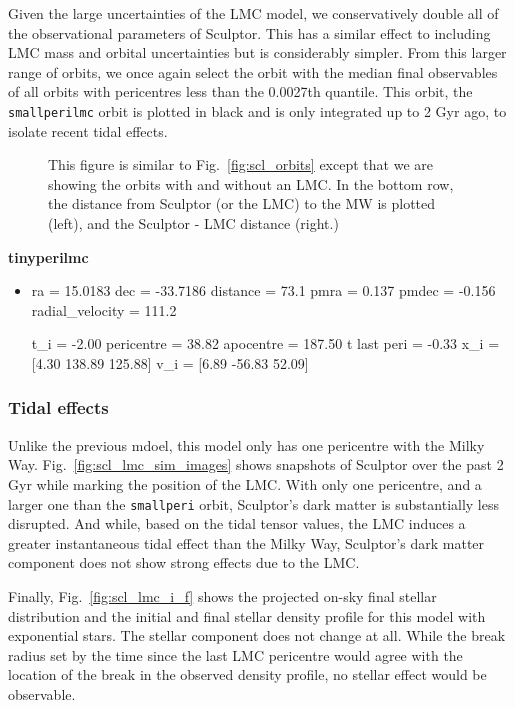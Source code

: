 Given the large uncertainties of the LMC model, we conservatively double
all of the observational parameters of Sculptor. This has a similar
effect to including LMC mass and orbital uncertainties but is
considerably simpler. From this larger range of orbits, we once again
select the orbit with the median final observables of all orbits with
pericentres less than the 0.0027th quantile. This orbit, the
\texttt{smallperilmc} orbit is plotted in black and is only integrated
up to 2 Gyr ago, to isolate recent tidal effects.

\begin{figure}
\centering
{}
\caption[Sculptor Orbits with LMC]{This figure is similar to
Fig.~\ref{fig:scl_orbits} except that we are showing the orbits with and
without an LMC. In the bottom row, the distance from Sculptor (or the
LMC) to the MW is plotted (left), and the Sculptor - LMC distance
(right.)}\label{fig:scl_lmc_orbits_effect}
\end{figure}

\textbf{tinyperilmc}

\begin{itemize}
\item
  ra = 15.0183 dec = -33.7186 distance = 73.1 pmra = 0.137 pmdec =
  -0.156 radial\_velocity = 111.2

  t\_i = -2.00 pericentre = 38.82 apocentre = 187.50 t last peri = -0.33
  x\_i = {[}4.30 138.89 125.88{]} v\_i = {[}6.89 -56.83 52.09{]}
\end{itemize}

\subsubsection{Tidal effects}\label{tidal-effects-1}

Unlike the previous mdoel, this model only has one pericentre with the
Milky Way. Fig.~\ref{fig:scl_lmc_sim_images} shows snapshots of Sculptor
over the past 2 Gyr while marking the position of the LMC. With only one
pericentre, and a larger one than the \texttt{smallperi} orbit,
Sculptor's dark matter is substantially less disrupted. And while, based
on the tidal tensor values, the LMC induces a greater instantaneous
tidal effect than the Milky Way, Sculptor's dark matter component does
not show strong effects due to the LMC.

Finally, Fig.~\ref{fig:scl_lmc_i_f} shows the projected on-sky final
stellar distribution and the initial and final stellar density profile
for this model with exponential stars. The stellar component does not
change at all. While the break radius set by the time since the last LMC
pericentre would agree with the location of the break in the observed
density profile, no stellar effect would be observable.

